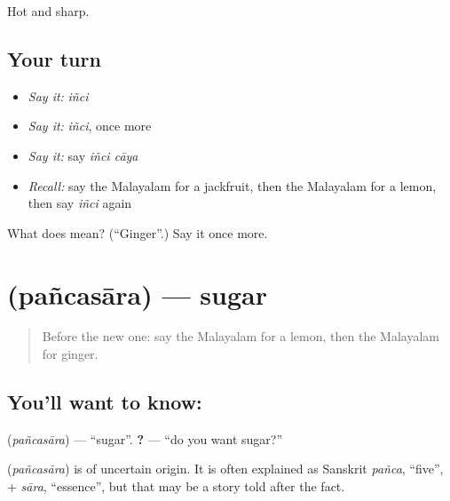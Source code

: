 \begin{grammarlens}[title={What you've built}]
Hot and sharp.
\end{grammarlens}

\subsection*{Your turn}
\begin{itemize}
\raggedright
  \item \emph{Say it:} \emph{iñci}
  \item \emph{Say it:} \emph{iñci}, once more
  \item \emph{Say it:} say \emph{iñci cāya}
  \item \emph{Recall:} say the Malayalam for a jackfruit, then the Malayalam for a lemon, then say \emph{iñci} again
\end{itemize}

\begin{tcolorbox}[breakable,colback=teal!4,colframe=teal!35!black,title={Before you move on}]
What does  mean? (\textquotedblleft{}Ginger\textquotedblright{}.) Say it once more.
\end{tcolorbox}
\section[\texorpdfstring{\ml{പഞ്ചസാര} (pañcasāra)}{പഞ്ചസാര (pañcasāra)}]{ (pañcasāra) — sugar}

\label{lesson:ML-C133-sugar}



\begin{quote}
Before the new one: say the Malayalam for a lemon, then the Malayalam for ginger.
\end{quote}

\subsection*{You'll want to know: }
\textbf{} (\emph{pañcasāra}) — \textquotedblleft{}sugar\textquotedblright{}. \textbf{ ?} — \textquotedblleft{}do you want sugar?\textquotedblright{}

\begin{cousinweb}
\textbf{} (\emph{pañcasāra}) is of uncertain origin. It is often explained as Sanskrit \emph{pañca}, \textquotedblleft{}five\textquotedblright{}, + \emph{sāra}, \textquotedblleft{}essence\textquotedblright{}, but that may be a story told after the fact.
\end{cousinweb}

